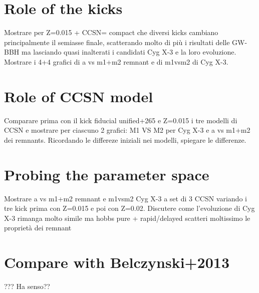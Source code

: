 \documentclass[a4paper,titlepage]{book}     	%
\begin{document}
\section{Role of the kicks}
Mostrare per Z=0.015 + CCSN= compact che diversi kicks cambiano principalmente il semiasse finale, scatterando molto di più i risultati delle GW-BBH ma lasciando quasi inalterati i candidati Cyg X-3 e la loro evoluzione. Mostrare i 4+4 grafici di a vs m1+m2 remnant e di m1vsm2 di Cyg X-3.

\section{Role of CCSN model}
Comparare prima con il kick fiducial unified+265 e Z=0.015 i tre modelli di CCSN e mostrare per ciascuno 2 grafici: M1 VS M2 per Cyg X-3 e a vs m1+m2 dei remnants. Ricordando le differeze iniziali nei modelli, spiegare le differenze.


\section{Probing the parameter space}
Mostrare a vs m1+m2 remnant e m1vsm2 Cyg X-3 a set di 3 CCSN variando i tre kick prima con Z=0.015 e poi con Z=0.02. Discutere come l'evoluzione di Cyg X-3 rimanga molto simile ma hobbs pure + rapid/delayed scatteri moltissimo le proprietà dei remnant





\section{Compare with Belczynski+2013}
??? Ha senso??
\end{document}
